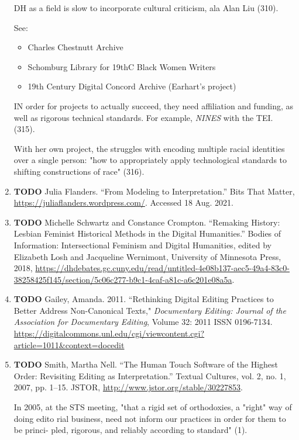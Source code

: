 \documentclass[11pt]{article}
\begin{document}
\begin{enumerate}
DH as a field is slow to incorporate cultural criticism, ala Alan
Liu (310). 

See: 
\begin{itemize}
\item Charles Chestnutt Archive
\item Schomburg Library for 19thC Black Women Writers
\item 19th Century Digital Concord Archive (Earhart's project)
\end{itemize}

IN order for projects to actually succeed, they need affiliation and
funding, as well as rigorous technical standards. For example, \emph{NINES}
with the TEI. (315).

With her own project, the struggles with encoding multiple racial
identities over a single person: "how to appropriately apply
technological standards to shifting constructions of race" (316). 

\item {\bfseries\sffamily TODO} Julia Flanders. “From Modeling to Interpretation.” Bits That
\label{sec:org6905c94}
Matter, \url{https://juliaflanders.wordpress.com/}. Accessed 18 Aug. 2021.
\item {\bfseries\sffamily TODO} Michelle Schwartz and Constance Crompton. “Remaking History:
\label{sec:org6c96be1}
Lesbian Feminist Historical Methods in the Digital Humanities.” Bodies
of Information: Intersectional Feminism and Digital Humanities, edited
by Elizabeth Losh and Jacqueline Wernimont, University of Minnesota
Press, 2018,
\url{https://dhdebates.gc.cuny.edu/read/untitled-4e08b137-aec5-49a4-83c0-38258425f145/section/5c06c277-b9c1-4caf-a81c-a6c201e08a5a}.

\item {\bfseries\sffamily TODO} Gailey, Amanda. 2011. “Rethinking Digital
\label{sec:org2e7d8a6}
Editing Practices to Better Address Non-Canonical Texts," \emph{Documentary
Editing: Journal of the Association for Documentary Editing}, Volume
32: 2011 ISSN
0196-7134. \url{https://digitalcommons.unl.edu/cgi/viewcontent.cgi?article=1011\&context=docedit}  

\item {\bfseries\sffamily TODO} Smith, Martha Nell. “The Human Touch Software of the Highest
\label{sec:org49d0105}
Order: Revisiting Editing as Interpretation.” Textual Cultures,
vol. 2, no. 1, 2007, pp. 1–15. JSTOR,
\url{http://www.jstor.org/stable/30227853}.

In 2005, at the STS meeting, "that a rigid set of orthodoxies, a
"right" way of doing edito rial business, need not inform our
practices in order for them to be princi- pled, rigorous, and reliably
according to standard" (1). 


\end{enumerate}
\end{document}
